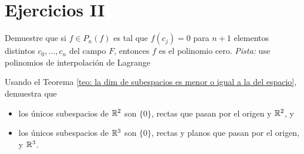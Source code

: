 \section{Ejercicios II}

\begin{ej}
Demuestre que si $f \in P_{n}(f)$ es tal que
$f(c_{j})=0$ para $n+1$ elementos distintos
$c_{0}, \ldots , c_{n}$ del campo $F$, entonces
$f$ es el polinomio cero. 
\textit{Pista:} use polinomios de interpolación de Lagrange
\end{ej}


\begin{ej}
Usando el Teorema 
\ref{teo: la dim de subespacios es menor o igual a la del espacio}, 
demuestra que
\begin{itemize}
	\item los únicos subespacios de $\mathbb{R}^{2}$ son $\{ 0 \}$,
	rectas que pasan por el origen y $\mathbb{R}^{2}$, y
	\item los únicos subespacios de $\mathbb{R}^{3}$ son 
	$\{ 0 \}$, rectas y planos que pasan por el origen,
	y $\mathbb{R}^{3}$.
\end{itemize}
\end{ej}

\newpage